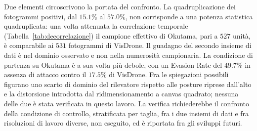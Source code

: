 \ifstampa\documentclass[a4paper,12pt,twoside,openright]{report}\else\documentclass[a4paper,12pt]{report}\fi
\newif\ifrevisione \revisionefalse
\DeclareRobustCommand{\rev}[1]{\ifrevisione{\color{blue!65!black}#1}\else#1\fi}
\begin{document}
Due elementi circoscrivono la portata del confronto. La quadruplicazione dei fotogrammi positivi, dal $15.1\%$ al $57.0\%$, non corrisponde a una potenza statistica quadruplicata: una volta attenuata la correlazione temporale (Tabella~\ref{tab:decorrelazione}) il campione effettivo di Okutama, pari a $527$ unità, è comparabile ai $531$ fotogrammi di VisDrone. Il guadagno del secondo insieme di dati è nel dominio osservato e non nella numerosità campionaria. La condizione di partenza su Okutama è a sua volta più debole, con un Evasion Rate del $49.7\%$ in assenza di attacco contro il $17.5\%$ di VisDrone. Fra le spiegazioni possibili figurano uno scarto di dominio del rilevatore rispetto alle posture riprese dall'alto e la distorsione introdotta dal ridimensionamento a canvas quadrato; nessuna delle due è stata verificata in questo lavoro. La verifica richiederebbe \rev{il confronto della condizione di controllo, stratificata per taglia, fra i due insiemi di dati e fra risoluzioni di lavoro diverse}, non eseguito, ed è riportata fra gli sviluppi futuri.
\end{document}
